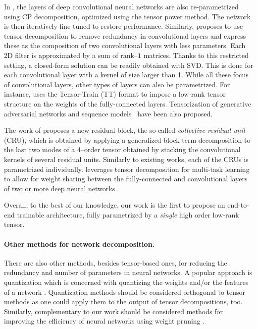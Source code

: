 \documentclass[10pt,twocolumn,letterpaper]{article}
\begin{document}
In \cite{astrid2017cp}, the layers of deep convolutional neural networks are also re-parametrized using CP decomposition, optimized using the tensor power method. The network is then iteratively fine-tuned to restore performance.
Similarly, \cite{tai2015convolutional} proposes to use tensor decomposition to remove redundancy in convolutional layers and express these as the composition of two convolutional layers with less parameters. Each 2D filter is approximated by a sum of rank--\(1\) matrices. Thanks to this restricted setting, a closed-form solution can be readily obtained with SVD. This is done for each convolutional layer with a kernel of size larger than 1.
While all these focus of convolutional layers, other types of layers can also be parametrized.
For instance, \cite{novikov2015tensorizing} uses the Tensor-Train (TT) format \cite{oseledets2011tensor} to impose a low-rank tensor structure on the weights of the fully-connected layers. Tensorization of generative adversarial networks \cite{tensor-gan} and sequence models~\cite{tensor-rnn} have  been also proposed.

The work of \cite{chen2017sharing} proposes a new residual block, the so-called \emph{collective residual unit} (CRU), which is obtained by applying a generalized block term decomposition to the last two modes of a 4\myth--order tensor obtained by stacking the convolutional kernels of several residual units. Similarly to existing works, each of the CRUs is parametrized individually. \cite{yang2016deep} leverages tensor decomposition for multi-task learning to allow for weight sharing between the fully-connected and convolutional layers of two or more deep neural networks.

Overall, to the best of our knowledge, our work is the first to propose an end-to-end trainable architecture, fully parametrized by a \emph{single} high order low-rank tensor.

\paragraph{Other methods for network decomposition.} 
There are also other methods, besides tensor-based ones, for reducing the redundancy and number of parameters in neural networks. A popular approach is quantization which is concerned with quantizing the weights and/or the features of a network \cite{tung2018clip,wu2016quantized,zhou2018explicit,tang2018quantized, courbariaux2015binaryconnect,rastegari2016xnor}. Quantization methods should be considered orthogonal to tensor methods as one could apply them to the output of tensor decompositions, too. Similarly, complementary to our work should be considered methods for improving the efficiency of neural networks using weight pruning \cite{li2017pruning, he2017channel}.
\end{document}
